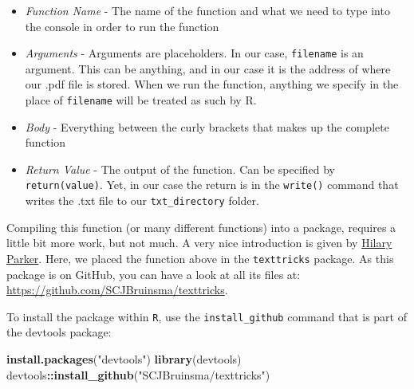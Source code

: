 \documentclass[
]{book}
\newenvironment{Shaded}{\begin{snugshade}}{\end{snugshade}}
\newcommand{\FunctionTok}[1]{\textcolor[rgb]{0.13,0.29,0.53}{\textbf{#1}}}
\newcommand{\NormalTok}[1]{#1}
\newcommand{\SpecialCharTok}[1]{\textcolor[rgb]{0.81,0.36,0.00}{\textbf{#1}}}
\newcommand{\StringTok}[1]{\textcolor[rgb]{0.31,0.60,0.02}{#1}}
\providecommand{\tightlist}{%
  \setlength{\itemsep}{0pt}\setlength{\parskip}{0pt}}
\begin{document}
\begin{itemize}
\tightlist
\item
  \emph{Function Name} - The name of the function and what we need to type into the console in order to run the function
\item
  \emph{Arguments} - Arguments are placeholders. In our case, \texttt{filename} is an argument. This can be anything, and in our case it is the address of where our .pdf file is stored. When we run the function, anything we specify in the place of \texttt{filename} will be treated as such by R.
\item
  \emph{Body} - Everything between the curly brackets that makes up the complete function
\item
  \emph{Return Value} - The output of the function. Can be specified by \texttt{return(value)}. Yet, in our case the return is in the \texttt{write()} command that writes the .txt file to our \texttt{txt\_directory} folder.
\end{itemize}

Compiling this function (or many different functions) into a package, requires a little bit more work, but not much. A very nice introduction is given by \href{https://hilaryparker.com/2014/04/29/writing-an-r-package-from-scratch/}{Hilary Parker}. Here, we placed the function above in the \texttt{texttricks} package. As this package is on GitHub, you can have a look at all its files at: \url{https://github.com/SCJBruinsma/texttricks}.

To install the package within \texttt{R}, use the \texttt{install\_github} command that is part of the devtools package:

\begin{Shaded}
\begin{Highlighting}[]
\FunctionTok{install.packages}\NormalTok{(}\StringTok{"devtools"}\NormalTok{)}
\FunctionTok{library}\NormalTok{(devtools)}
\NormalTok{devtools}\SpecialCharTok{::}\FunctionTok{install\_github}\NormalTok{(}\StringTok{"SCJBruinsma/texttricks"}\NormalTok{)}
\end{Highlighting}
\end{Shaded}
\end{document}
